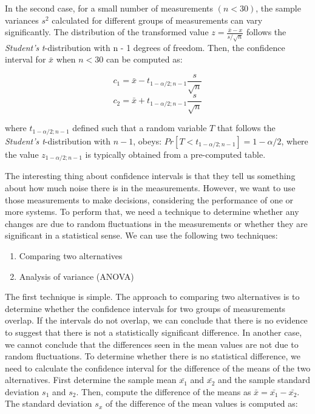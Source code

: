 In the second case, for a small number of measurements \((n < 30)\), the
sample variances \(s^2\) calculated for different groups of measurements can
vary significantly. The distribution of the transformed value \(z =
   \frac{\bar{x} - x}{s/\sqrt{n}}\) follows the \emph{Student's} \emph{t}-distribution
with n - 1 degrees of freedom. Then, the confidence interval for \(\bar{x}\)
when \(n < 30\) can be computed as:

\begin{equation}
c_1 = \bar{x} - t_{1-\alpha/2;n-1}\frac{s}{\sqrt{n}}
\end{equation}
\begin{equation}
c_2 = \bar{x} + t_{1-\alpha/2;n-1}\frac{s}{\sqrt{n}}
\end{equation}

where \(t_{1 - \alpha/2;n-1}\) defined such that a random variable \(T\) that
follows the \emph{Student's t}-distribution with \(n - 1\), obeys: \(Pr[T < t_{1 -
   \alpha/2;n - 1}] = 1 - \alpha/2\), where the value \(z_{1 - \alpha/2;n - 1}\)
is typically obtained from a pre-computed table.

The interesting thing about confidence intervals is that they tell us
something about how much noise there is in the measurements. However, we want
to use those measurements to make decisions, considering the performance of
one or more systems. To perform that, we need a technique to determine
whether any changes are due to random fluctuations in the measurements or
whether they are significant in a statistical sense. We can use the following
two techniques:

\begin{enumerate}
\item Comparing two alternatives
\item Analysis of variance (ANOVA)
\end{enumerate}

The first technique is simple. The approach to comparing two alternatives is
to determine whether the confidence intervals for two groups of measurements
overlap. If the intervals do not overlap, we can conclude that there is no
evidence to suggest that there is not a statistically significant
difference. In another case, we cannot conclude that the differences seen in
the mean values are not due to random fluctuations. To determine whether
there is no statistical difference, we need to calculate the confidence
interval for the difference of the means of the two alternatives. First
determine the sample mean \(\bar{x_1}\) and \(\bar{x_2}\) and the sample
standard deviation \(s_1\) and \(s_2\). Then, compute the difference of the
means as \(\bar{x} = \bar{x_1} - \bar{x_2}\). The standard deviation \(s_x\)
of the difference of the mean values is computed as:


